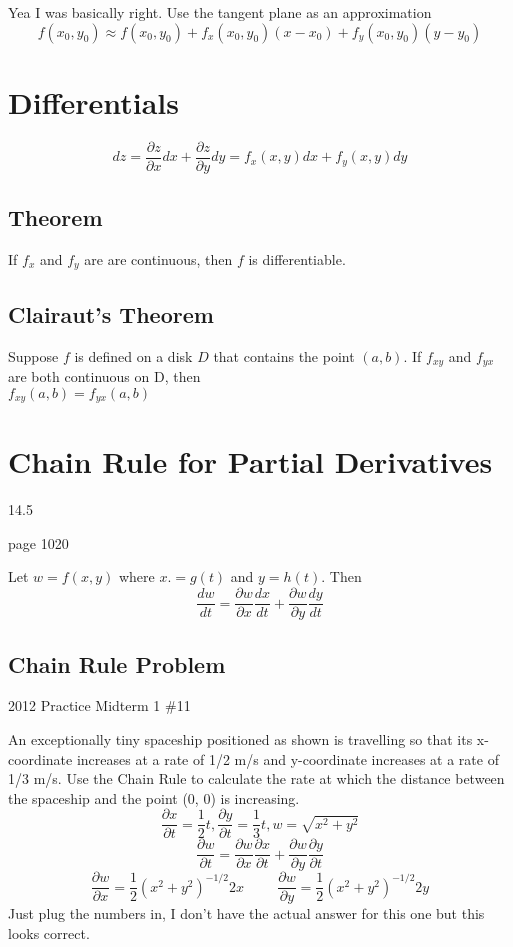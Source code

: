 \documentclass{report}
\newcommand{\pdif}[2]{ \frac{\partial #1}{ \partial #2} }
\begin{document}
Yea I was basically right. Use the tangent plane as an approximation
$$
f(x_0, y_0) \approx f(x_0, y_0) + f_x(x_0, y_0) (x - x_0) + f_y(x_0, y_0) (y - y_0)
$$
\section{Differentials}
$$
dz = \pdif{z}{x} dx + \pdif{z}{y}dy = f_x(x, y)dx + f_y(x, y)dy
$$

\subsection*{Theorem}
If $f_x$ and $f_y$ are are continuous, then $f$ is differentiable.

\subsection{Clairaut's Theorem}
Suppose $f$ is defined on a disk $D$ that contains the point $(a, b)$. If $f_{xy}$ and $f_{yx}$ are both continuous on D, then \\
$f_{xy}(a,b) = f_{yx}(a,b)$

\section{Chain Rule for Partial Derivatives}
14.5

page 1020
	
Let $w = f(x, y)$ where $x.= g(t)$ and $y = h(t)$. Then
$$
\frac{d w}{dt} = \pdif{w}{x} \frac{dx}{dt} + 
\pdif{w}{y}
\frac{dy}{dt}
$$

\newpage
\subsection{Chain Rule Problem}
2012 Practice Midterm 1 \#11 

An exceptionally tiny spaceship positioned as shown is travelling so that its
x-coordinate increases at a rate
of 1/2 m/s and y-coordinate increases at a rate of 1/3 m/s. Use the Chain Rule to calculate the rate at which
the distance between the spaceship and the point (0, 0) is increasing.
$$
\pdif{x}{t} = \frac{1}{2}t, \pdif{y}{t} = \frac{1}{3}t, w = \sqrt{x^2 + y^2}
$$
$$
\pdif{w}{t} = \pdif{w}{x} \pdif{x}{t} + \pdif{w}{y} \pdif{y}{t}
$$
$$
\pdif{w}{x} = \frac{1}{2}(x^2+y^2)^{-1/2}2x \hspace{1cm}
\pdif{w}{y} = \frac{1}{2}(x^2+y^2)^{-1/2}2y
$$
Just plug the numbers in, I don't have the actual answer for this one but this looks correct.
\end{document}
